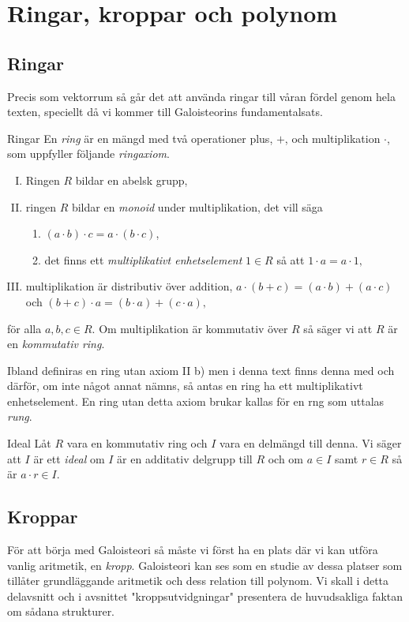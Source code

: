 \documentclass{article}
\theoremstyle{definition}
\begin{document}
\section{Ringar, kroppar och polynom}
\subsection{Ringar}
Precis som vektorrum så går det att använda ringar till våran fördel genom hela texten, speciellt då vi kommer till
Galoisteorins fundamentalsats.  
\begin{mydef}{Ringar}{}
  En \textit{ring} är en mängd med två operationer plus, $+$, och multiplikation $\cdot$, som uppfyller följande \textit{ringaxiom}.
  \begin{enumerate}[I)]
    \item Ringen $R$ bildar en abelsk grupp,
    \item ringen $R$ bildar en \textit{monoid} under multiplikation, det vill säga 
    \begin{enumerate}
      \item $(a \cdot b) \cdot c = a \cdot (b \cdot c)$,
      \item det finns ett \textit{multiplikativt enhetselement} $1 \in R$ så att $1 \cdot a = a \cdot 1,$
    \end{enumerate}
    \item multiplikation är distributiv över addition, $a \cdot (b+c) = (a \cdot b) + (a \cdot c)$ och $(b + c) \cdot a = (b \cdot a) + (c \cdot a),$
  \end{enumerate}
  för alla $a, b, c \in R$. Om multiplikation är kommutativ över $R$ så säger vi att $R$ är en \textit{kommutativ ring}. 
\end{mydef}
Ibland definiras en ring utan axiom II b) men i denna text finns denna med och därför, om inte något annat nämns, så antas en ring ha ett multiplikativt enhetselement. 
En ring utan detta axiom brukar kallas för en rng som uttalas \textit{rung}.

\begin{mydef}{Ideal}{}
  Låt $R$ vara en kommutativ ring och $I$ vara en delmängd till denna. Vi säger att $I$ är ett \textit{ideal} om $I$ är en additativ delgrupp till $R$
  och om $a \in I$ samt $r \in R$ så är $a \cdot r \in I$.
\end{mydef}

\subsection{Kroppar}
För att börja med Galoisteori så måste vi först ha en plats där vi kan utföra vanlig aritmetik, en \textit{kropp}. Galoisteori kan ses som en studie 
av dessa platser som tillåter grundläggande aritmetik och dess relation till polynom. Vi skall i detta delavsnitt och i avsnittet "kroppsutvidgningar" 
presentera de huvudsakliga faktan om 
sådana strukturer. 
\end{document}
